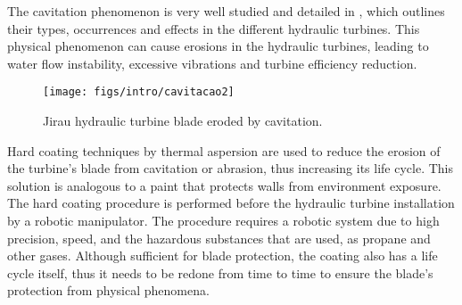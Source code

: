 The cavitation phenomenon is very well studied and detailed in
\cite{escaler2006detection}, which outlines their types, occurrences and
effects in the different hydraulic turbines. This physical phenomenon can cause
erosions in the hydraulic turbines, leading to water flow instability,
excessive vibrations and turbine efficiency reduction.

\begin{figure}[h!]	
	\texttt{[image: figs/intro/cavitacao2]}
	\caption{Jirau hydraulic turbine blade eroded by cavitation.}
	\label{fig::cavitacao}
\end{figure}

Hard coating techniques by thermal aspersion
are used to reduce the erosion of the turbine's blade from cavitation or
abrasion, thus increasing its life cycle. This solution is analogous to a paint
that protects walls from environment exposure. The hard coating procedure is performed
before the hydraulic turbine installation by a robotic manipulator. The
procedure requires a robotic system due to high precision, speed, and
the hazardous substances that are used, as propane and other gases.
Although sufficient for blade protection, the coating also has a life
cycle itself, thus it needs to be redone from time to time to ensure the
blade's protection from physical phenomena.

